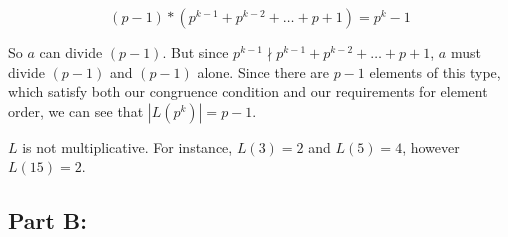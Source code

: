 \documentclass[12pt]{article}
\theoremstyle{moo}
\begin{document}
\[(p-1)*(p^{k-1} + p^{k-2} + \ldots + p + 1) = p^k - 1 \]

So $a$ can divide $(p-1)$. But since $p^{k-1} \nmid p^{k-1} + p^{k-2} + \ldots + p + 1$, $a$ must divide $(p-1)$ and $(p-1)$ alone. Since there are $p-1$ elements of this type, which satisfy both our congruence condition and our requirements for element order, we can see that $|L(p^k)| = p-1$.

$L$ is not multiplicative. For instance, $L(3) = 2$ and $L(5) = 4$, however $L(15) = 2$.


\subsection*{Part B:}
\end{document}
